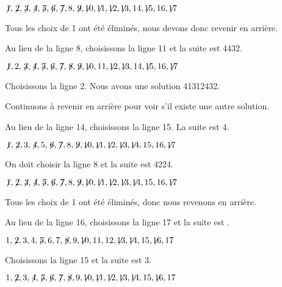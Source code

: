 $\not\! 1,\not\! 2,\not\! 3,\not\! 4,\not\! 5,\not\! 6,\not\! 7,8,\not\! 9,\not\!\! 10,\not\!\! 11,\not\!\! 12,\not\!\! 13,14, \not\!\! 15,16,\not\!\! 17$

\noindent Tous les choix de 1 ont été éliminés, nous devons donc revenir en arrière.

\smallskip

\noindent Au lieu de la ligne 8, choisissons la ligne 11 et la suite est  44{}3{}2.


$\not\! 1,2,\not\! 3,\not\! 4,\not\! 5,\not\! 6,\not\! 7,\not\! 8,\not\! 9,\not\!\! 10,11,\not\!\! 12,\not\!\! 13,14, \not\!\! 15,16,\not\!\! 17$

\noindent Choisissons la ligne 2. Nous avons une solution 4{}1{}3{}1{}2{}4{}3{}2.

\smallskip

\noindent Continuons à revenir en arrière pour voir s'il existe une autre solution.

\smallskip

\noindent Au lieu de la ligne 14, choisissons la ligne 15. La suite est  4\textvisiblespace {}.

$\not\! 1,\not\! 2,3,\not\! 4,5,\not\! 6,\not\! 7,8,\not\! 9,\not\!\! 10,\not\!\! 11,\not\!\! 12,\not\!\! 13,\not\!\! 14,15,16,\not\!\! 17$



\noindent On doit choisir la ligne 8 et la suite est 4{}22{}4.

$\not\! 1,\not\! 2,\not\! 3,\not\! 4,\not\! 5,\not\! 6,\not\! 7,8,\not\! 9,\not\!\! 10,\not\!\! 11,\not\!\! 12,\not\!\! 13,\not\!\! 14,15,16,\not\!\! 17$

\noindent Tous les choix de 1 ont été éliminés, donc nous revenons en arrière.

\smallskip

\noindent Au lieu de la ligne 16, choisissons la ligne 17 et la suite est \textvisiblespace \textvisiblespace \textvisiblespace{}\textvisiblespace.

$1,\not\! 2,3,4,\not\! 5,6,7,\not\! 8,9,\not\!\! 10,11,12,\not\!\! 13,\not\!\! 14,15,\not\!\! 16,17$

\noindent Choisissons la ligne 15 et la suite est  \textvisiblespace{}3.

$1,\not\! 2,3,\not\! 4,\not\! 5,\not\! 6,\not\! 7,\not\! 8,9,\not\!\! 10,\not\!\! 11,\not\!\! 12,\not\!\! 13,\not\!\! 14,15,\not\!\! 16,17$

